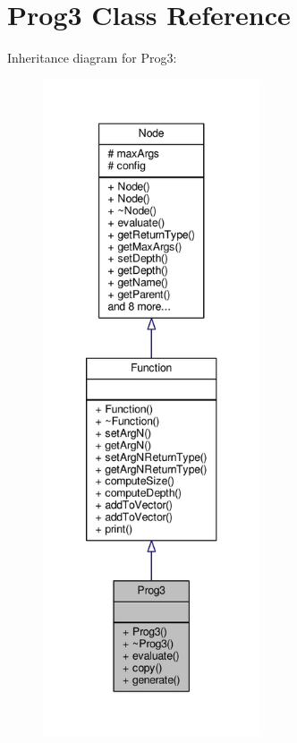 \hypertarget{classProg3}{}\section{Prog3 Class Reference}
\label{classProg3}


Inheritance diagram for Prog3\+:
\nopagebreak
\begin{figure}[H]
\begin{center}
\leavevmode
\includegraphics[height=550pt]{classProg3__inherit__graph}
\end{center}
\end{figure}


